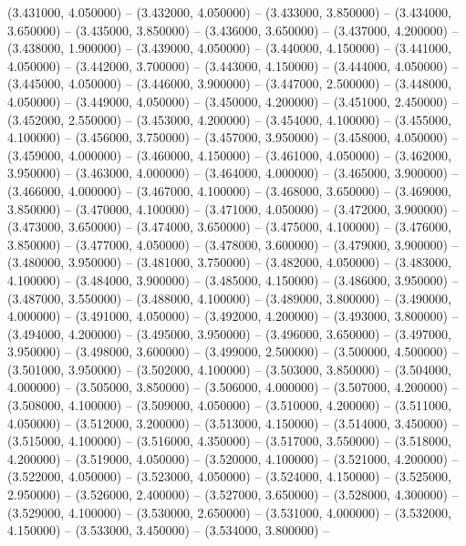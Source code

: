 (3.431000, 4.050000) -- 
(3.432000, 4.050000) -- 
(3.433000, 3.850000) -- 
(3.434000, 3.650000) -- 
(3.435000, 3.850000) -- 
(3.436000, 3.650000) -- 
(3.437000, 4.200000) -- 
(3.438000, 1.900000) -- 
(3.439000, 4.050000) -- 
(3.440000, 4.150000) -- 
(3.441000, 4.050000) -- 
(3.442000, 3.700000) -- 
(3.443000, 4.150000) -- 
(3.444000, 4.050000) -- 
(3.445000, 4.050000) -- 
(3.446000, 3.900000) -- 
(3.447000, 2.500000) -- 
(3.448000, 4.050000) -- 
(3.449000, 4.050000) -- 
(3.450000, 4.200000) -- 
(3.451000, 2.450000) -- 
(3.452000, 2.550000) -- 
(3.453000, 4.200000) -- 
(3.454000, 4.100000) -- 
(3.455000, 4.100000) -- 
(3.456000, 3.750000) -- 
(3.457000, 3.950000) -- 
(3.458000, 4.050000) -- 
(3.459000, 4.000000) -- 
(3.460000, 4.150000) -- 
(3.461000, 4.050000) -- 
(3.462000, 3.950000) -- 
(3.463000, 4.000000) -- 
(3.464000, 4.000000) -- 
(3.465000, 3.900000) -- 
(3.466000, 4.000000) -- 
(3.467000, 4.100000) -- 
(3.468000, 3.650000) -- 
(3.469000, 3.850000) -- 
(3.470000, 4.100000) -- 
(3.471000, 4.050000) -- 
(3.472000, 3.900000) -- 
(3.473000, 3.650000) -- 
(3.474000, 3.650000) -- 
(3.475000, 4.100000) -- 
(3.476000, 3.850000) -- 
(3.477000, 4.050000) -- 
(3.478000, 3.600000) -- 
(3.479000, 3.900000) -- 
(3.480000, 3.950000) -- 
(3.481000, 3.750000) -- 
(3.482000, 4.050000) -- 
(3.483000, 4.100000) -- 
(3.484000, 3.900000) -- 
(3.485000, 4.150000) -- 
(3.486000, 3.950000) -- 
(3.487000, 3.550000) -- 
(3.488000, 4.100000) -- 
(3.489000, 3.800000) -- 
(3.490000, 4.000000) -- 
(3.491000, 4.050000) -- 
(3.492000, 4.200000) -- 
(3.493000, 3.800000) -- 
(3.494000, 4.200000) -- 
(3.495000, 3.950000) -- 
(3.496000, 3.650000) -- 
(3.497000, 3.950000) -- 
(3.498000, 3.600000) -- 
(3.499000, 2.500000) -- 
(3.500000, 4.500000) -- 
(3.501000, 3.950000) -- 
(3.502000, 4.100000) -- 
(3.503000, 3.850000) -- 
(3.504000, 4.000000) -- 
(3.505000, 3.850000) -- 
(3.506000, 4.000000) -- 
(3.507000, 4.200000) -- 
(3.508000, 4.100000) -- 
(3.509000, 4.050000) -- 
(3.510000, 4.200000) -- 
(3.511000, 4.050000) -- 
(3.512000, 3.200000) -- 
(3.513000, 4.150000) -- 
(3.514000, 3.450000) -- 
(3.515000, 4.100000) -- 
(3.516000, 4.350000) -- 
(3.517000, 3.550000) -- 
(3.518000, 4.200000) -- 
(3.519000, 4.050000) -- 
(3.520000, 4.100000) -- 
(3.521000, 4.200000) -- 
(3.522000, 4.050000) -- 
(3.523000, 4.050000) -- 
(3.524000, 4.150000) -- 
(3.525000, 2.950000) -- 
(3.526000, 2.400000) -- 
(3.527000, 3.650000) -- 
(3.528000, 4.300000) -- 
(3.529000, 4.100000) -- 
(3.530000, 2.650000) -- 
(3.531000, 4.000000) -- 
(3.532000, 4.150000) -- 
(3.533000, 3.450000) -- 
(3.534000, 3.800000) -- 
